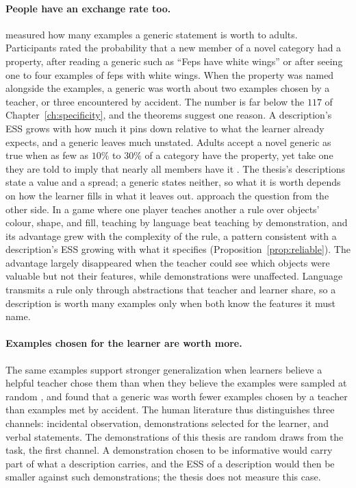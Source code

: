 \paragraph{People have an exchange rate too.} \citet{tessler2020} measured how many examples a generic statement is worth to adults. Participants rated the probability that a new member of a novel category had a property, after reading a generic such as ``Feps have white wings'' or after seeing one to four examples of feps with white wings. When the property was named alongside the examples, a generic was worth about two examples chosen by a teacher, or three encountered by accident. The number is far below the $117$ of Chapter~\ref{ch:specificity}, and the theorems suggest one reason. A description's ESS grows with how much it pins down relative to what the learner already expects, and a generic leaves much unstated. Adults accept a novel generic as true when as few as $10\%$ to $30\%$ of a category have the property, yet take one they are told to imply that nearly all members have it \citep{cimpian2010}. The thesis's descriptions state a value and a spread; a generic states neither, so what it is worth depends on how the learner fills in what it leaves out. \citet{sumers2023} approach the question from the other side. In a game where one player teaches another a rule over objects' colour, shape, and fill, teaching by language beat teaching by demonstration, and its advantage grew with the complexity of the rule, a pattern consistent with a description's ESS growing with what it specifies (Proposition~\ref{prop:reliable}). The advantage largely disappeared when the teacher could see which objects were valuable but not their features, while demonstrations were unaffected. Language transmits a rule only through abstractions that teacher and learner share, so a description is worth many examples only when both know the features it must name.

\paragraph{Examples chosen for the learner are worth more.} The same examples support stronger generalization when learners believe a helpful teacher chose them than when they believe the examples were sampled at random \citep{shafto2014}, and \citet{tessler2020} found that a generic was worth fewer examples chosen by a teacher than examples met by accident. The human literature thus distinguishes three channels: incidental observation, demonstrations selected for the learner, and verbal statements. The demonstrations of this thesis are random draws from the task, the first channel. A demonstration chosen to be informative would carry part of what a description carries, and the ESS of a description would then be smaller against such demonstrations; the thesis does not measure this case.

